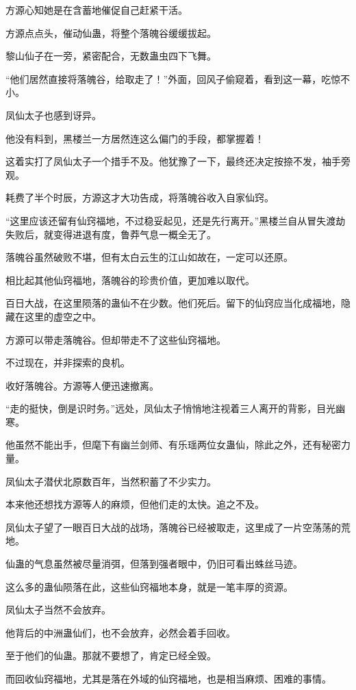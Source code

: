 \begin{this_body}
方源心知她是在含蓄地催促自己赶紧干活。

方源点点头，催动仙蛊，将整个落魄谷缓缓拔起。

黎山仙子在一旁，紧密配合，无数蛊虫四下飞舞。

“他们居然直接将落魄谷，给取走了！”外面，回风子偷窥着，看到这一幕，吃惊不小。

凤仙太子也感到讶异。

他没有料到，黑楼兰一方居然连这么偏门的手段，都掌握着！

这着实打了凤仙太子一个措手不及。他犹豫了一下，最终还决定按捺不发，袖手旁观。

耗费了半个时辰，方源这才大功告成，将落魄谷收入自家仙窍。

“这里应该还留有仙窍福地，不过稳妥起见，还是先行离开。”黑楼兰自从冒失渡劫失败后，就变得进退有度，鲁莽气息一概全无了。

落魄谷虽然破败不堪，但有太白云生的江山如故在，一定可以还原。

相比起其他仙窍福地，落魄谷的珍贵价值，更加难以取代。

百日大战，在这里陨落的蛊仙不在少数。他们死后。留下的仙窍应当化成福地，隐藏在这里的虚空之中。

方源可以带走落魄谷。但却带走不了这些仙窍福地。

不过现在，并非探索的良机。

收好落魄谷。方源等人便迅速撤离。

“走的挺快，倒是识时务。”远处，凤仙太子悄悄地注视着三人离开的背影，目光幽寒。

他虽然不能出手，但麾下有幽兰剑师、有乐瑶两位女蛊仙，除此之外，还有秘密力量。

凤仙太子潜伏北原数百年，当然积蓄了不少实力。

本来他还想找方源等人的麻烦，但他们走的太快。追之不及。

凤仙太子望了一眼百日大战的战场，落魄谷已经被取走，这里成了一片空荡荡的荒地。

仙蛊的气息虽然被尽量消弭，但落到强者眼中，仍旧可看出蛛丝马迹。

这么多的蛊仙陨落在此，这些仙窍福地本身，就是一笔丰厚的资源。

凤仙太子当然不会放弃。

他背后的中洲蛊仙们，也不会放弃，必然会着手回收。

至于他们的仙蛊。那就不要想了，肯定已经全毁。

而回收仙窍福地，尤其是落在外域的仙窍福地，也是相当麻烦、困难的事情。


\end{this_body}
